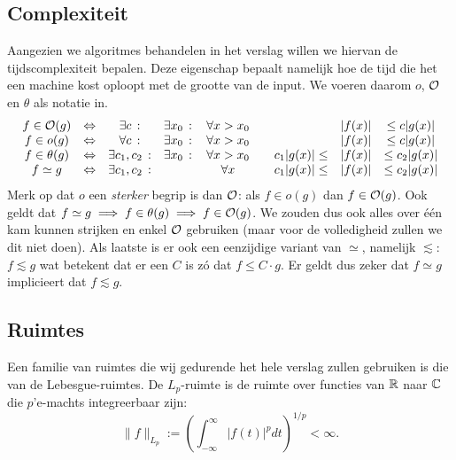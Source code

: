 \subsection{Complexiteit}

Aangezien we algoritmes behandelen in het verslag willen we hiervan de tijdscomplexiteit bepalen.
Deze eigenschap bepaalt namelijk hoe de tijd die het een machine kost oploopt met de grootte van de input.
We voeren daarom $o$, $\mathcal{O}$ en $\theta$ als notatie in.
\begin{equation*}
\begin{array}{cccccccc}
  f \in \mathcal{O}(g)     &\Leftrightarrow& \exists c     \,:&\exists x_0  \,:&\, 
  \forall x>x_0 \quad&& |f(x)| &\leq c|g(x)|  \\
  f \in o(g)      &\Leftrightarrow& \forall c     \,:&\exists x_0  \,:&\, 
  \forall x>x_0 \quad&& |f(x)| &\leq c |g(x)| \\ 
  f \in \theta(g) &\Leftrightarrow& \exists c_1,c_2\,:&\exists x_0  \,:&\, 
  \forall x>x_0 \quad& c_1|g(x)| \leq & |f(x)| &\leq c_2|g(x)|  \\
  f \simeq g & \Leftrightarrow& \exists c_1,c_2\,:& \,&\, 
  \forall x \quad& c_1|g(x)| \leq & |f(x)| &\leq c_2|g(x)| 

\end{array}
\end{equation*}
Merk op dat $o$ een \emph{sterker} begrip is dan $\mathcal{O}$: als $f \in o(g)$ dan $f \in \mathcal{O}(g)$. Ook geldt dat $f\simeq g \implies f\in\theta(g) \implies f \in \mathcal{O}(g)$. We zouden dus ook alles over \'e\'en kam kunnen strijken en enkel $\mathcal{O}$ gebruiken (maar voor de volledigheid zullen we dit niet doen). Als laatste is er ook een eenzijdige variant van $\simeq$, namelijk $\lesssim$: $f \lesssim g$ wat betekent dat er een $C$ is z\'o dat $f \leq C \cdot g$. Er geldt dus zeker dat $f\simeq g$ implicieert dat $f\lesssim g$.

\subsection{Ruimtes}
\label{ruimtes}
Een familie van ruimtes die wij gedurende het hele verslag zullen gebruiken is die van de Lebesgue-ruimtes. De $L_p$-ruimte is de ruimte over functies van $\mathbb{R}$ naar $\mathbb{C}$ die $p$'e-machts integreerbaar zijn:
\begin{equation}
	\label{lebesgue}
	\| f \|_{L_p} := \left(\int_{-\infty}^\infty |f(t)|^p dt\right)^{1/p} < \infty.
\end{equation}

